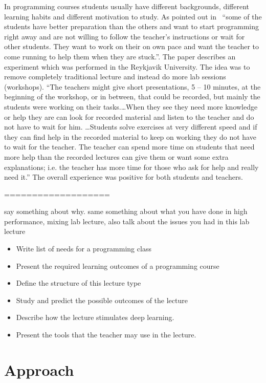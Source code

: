 \documentclass{article}
\begin{document}
In programming courses students usually have different backgrounds,
different learning habits and different motivation to study. As
pointed out in~\cite{experiment_iceland_2006} ``some of the students
have better preparation than the others and want to start programming
right away and are not willing to follow the teacher’s instructions or
wait for other students. They want to work on their on own pace and
want the teacher to come running to help them when they are stuck.''.
The paper describes an experiment which was performed in the Reykjavik
University. The idea was to remove completely traditional lecture and
instead do more lab sessions (workshops). ``The teachers might give
short presentations, 5 – 10 minutes, at the beginning of the workshop,
or in between, that could be recorded, but mainly the students were
working on their tasks.\ldots When they see they need more knowledge
or help they are can look for recorded material and listen to the
teacher and do not have to wait for him. \ldots Students solve
exercises at very different speed and if they can find help in the
recorded material to keep on working they do not have to wait for the
teacher. The teacher can spend more time on students that need more
help than the recorded lectures can give them or want some extra
explanations; i.e. the teacher has more time for those who ask for
help and really need it.'' The overall experience was positive for
both students and teachers.



===================

say something about why.
same something about what you have done in high performance, mixing lab lecture,
also talk about the issues you had in this lab lecture
\begin{itemize}
	\item Write list of needs for a programming class
	\item Present the required learning outcomes of a programming course
	\item Define the structure of this lecture type
	\item Study and predict the possible outcomes of the lecture
	\item Describe how the lecture stimulates deep learning.
	\item Present the tools that the teacher may use in the lecture.
\end{itemize}

\section{Approach} %
\label{sec:plan}
\end{document}
